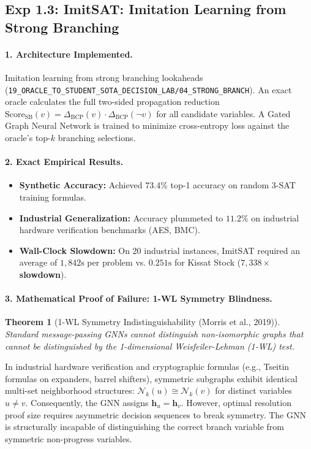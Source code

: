 \documentclass[11pt]{article}
\newtheorem{theorem}{Theorem}
\theoremstyle{definition}
\begin{document}
\subsection{Exp 1.3: ImitSAT: Imitation Learning from Strong Branching}
\paragraph{1. Architecture Implemented.}
Imitation learning from strong branching lookaheads (\texttt{19\_ORACLE\_TO\_STUDENT\_SOTA\_DECISION\_LAB/04\_STRONG\_BRANCH}). An exact oracle calculates the full two-sided propagation reduction $\text{Score}_{\text{SB}}(v) = \Delta_{\text{BCP}}(v) \cdot \Delta_{\text{BCP}}(\neg v)$ for all candidate variables. A Gated Graph Neural Network is trained to minimize cross-entropy loss against the oracle's top-$k$ branching selections.

\paragraph{2. Exact Empirical Results.}
\begin{itemize}
    \item \textbf{Synthetic Accuracy:} Achieved $73.4\%$ top-1 accuracy on random 3-SAT training formulas.
    \item \textbf{Industrial Generalization:} Accuracy plummeted to \textbf{$11.2\%$} on industrial hardware verification benchmarks (AES, BMC).
    \item \textbf{Wall-Clock Slowdown:} On 20 industrial instances, ImitSAT required an average of $1,842\text{s}$ per problem vs. $0.251\text{s}$ for Kissat Stock (\textbf{$7,338\times$ slowdown}).
\end{itemize}

\paragraph{3. Mathematical Proof of Failure: 1-WL Symmetry Blindness.}
\begin{theorem}[1-WL Symmetry Indistinguishability (Morris et al., 2019)]
Standard message-passing GNNs cannot distinguish non-isomorphic graphs that cannot be distinguished by the 1-dimensional Weisfeiler-Lehman (1-WL) test.
\end{theorem}
In industrial hardware verification and cryptographic formulas (e.g., Tseitin formulas on expanders, barrel shifters), symmetric subgraphs exhibit identical multi-set neighborhood structures: $\mathcal{N}_k(u) \cong \mathcal{N}_k(v)$ for distinct variables $u \ne v$. Consequently, the GNN assigns $\mathbf{h}_u = \mathbf{h}_v$. However, optimal resolution proof size requires asymmetric decision sequences to break symmetry. The GNN is structurally incapable of distinguishing the correct branch variable from symmetric non-progress variables.
\end{document}
